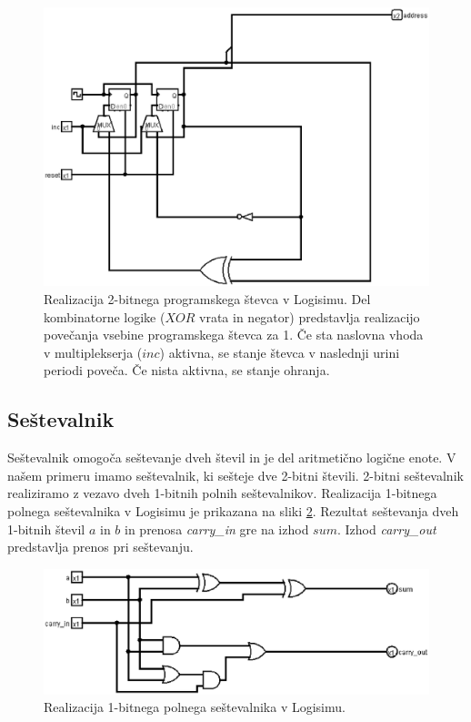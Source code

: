 \begin{figure}
\begin{center}
\includegraphics[width=0.75\columnwidth]{procesor/img/PC}%
\caption{Realizacija 2-bitnega programskega števca v Logisimu. Del kombinatorne logike ($XOR$ vrata in negator) predstavlja realizacijo povečanja vsebine programskega števca za 1. Če sta naslovna vhoda v multiplekserja ($inc$) aktivna, se stanje števca v naslednji urini periodi poveča. Če nista aktivna, se stanje ohranja.}%
\label{fig:pc}%
\end{center}
\end{figure}

\subsection{Seštevalnik}
Seštevalnik omogoča seštevanje dveh števil in je del aritmetično logične enote. V našem primeru imamo seštevalnik, ki sešteje dve 2-bitni števili. 2-bitni seštevalnik realiziramo z vezavo dveh 1-bitnih polnih seštevalnikov. Realizacija 1-bitnega polnega seštevalnika v Logisimu je prikazana na sliki \ref{fig:add_1bit}. Rezultat seštevanja dveh 1-bitnih števil $a$ in $b$ in prenosa \emph{carry\_in} gre na izhod $sum$. Izhod \emph{carry\_out} predstavlja prenos pri seštevanju.

\begin{figure}
\begin{center}
\includegraphics[width=0.75\columnwidth]{procesor/img/add_1bit}%
\caption{Realizacija 1-bitnega polnega seštevalnika v Logisimu.}%
\label{fig:add_1bit}%
\end{center}
\end{figure}

